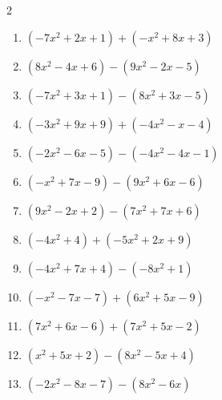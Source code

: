 \begin{multicols}{2}
\begin{enumerate}
  \item $(-7x^{2}+2x+1)+(-x^{2}+8x+3)$


  \item $(8x^{2}-4x+6)-(9x^{2}-2x-5)$


  \item $(-7x^{2}+3x+1)-(8x^{2}+3x-5)$


  \item $(-3x^{2}+9x+9)+(-4x^{2}-x-4)$


  \item $(-2x^{2}-6x-5)-(-4x^{2}-4x-1)$


  \item $(-x^{2}+7x-9)-(9x^{2}+6x-6)$


  \item $(9x^{2}-2x+2)-(7x^{2}+7x+6)$


  \item $(-4x^{2}+4)+(-5x^{2}+2x+9)$


  \item $(-4x^{2}+7x+4)-(-8x^{2}+1)$


  \item $(-x^{2}-7x-7)+(6x^{2}+5x-9)$


\columnbreak %

\resetques

  \item $(7x^{2}+6x-6)+(7x^{2}+5x-2)$


  \item $(x^{2}+5x+2)-(8x^{2}-5x+4)$


  \item $(-2x^{2}-8x-7)-(8x^{2}-6x)$



\end{enumerate}
\end{multicols}
